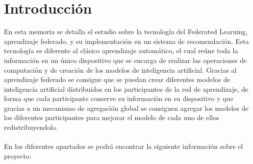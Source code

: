 \chapter{Introducción}
\thispagestyle{fancy}

En esta memoria se detalla el estudio sobre la tecnología del Federated Learning, aprendizaje federado, y su implementación en un sistema de recomendación. Esta tecnología es diferente al clásico aprendizaje automático, el cual reúne toda la información en un único dispositivo que se encarga de realizar las operaciones de computación y de creación de los modelos de inteligencia artificial. Gracias al aprendizaje federado se consigue que se puedan crear diferentes modelos de inteligencia artificial distribuidos en los participantes de la red de aprendizaje, de forma que cada participante conserve su información en su dispositivo y que gracias a un mecanismo de agregación global se consiguen agregar los modelos de los diferentes participantes para mejorar el modelo de cada uno de ellos redistribuyendolo. 
\\ \\
En los diferentes apartados se podrá encontrar la siguiente información sobre el proyecto:
